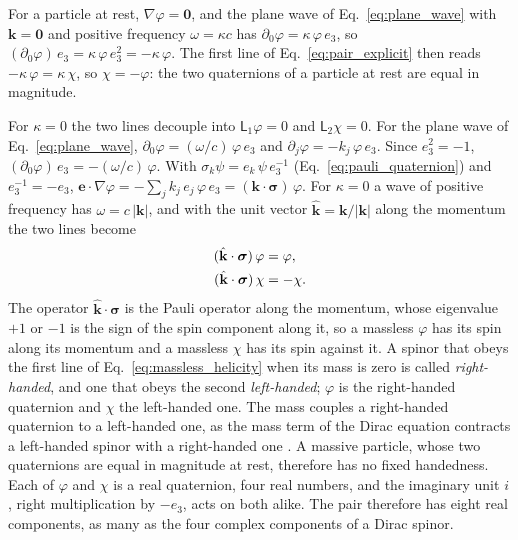 \documentclass[aps,prd,onecolumn,tightenlines,nofootinbib,notitlepage,11pt,floatfix]{revtex4-2}
\theoremstyle{indentedtheorem}
\begin{document}
For a particle at rest, $\nabla\varphi=\mathbf{0}$, and the plane wave of Eq.~\eqref{eq:plane_wave} with $\mathbf{k}=\mathbf{0}$ and positive frequency $\omega=\kappa c$ has $\partial_0\varphi=\kappa\,\varphi\,e_3$, so $(\partial_0\varphi)\,e_3=\kappa\,\varphi\,e_3^2=-\kappa\,\varphi$. The first line of Eq.~\eqref{eq:pair_explicit} then reads $-\kappa\,\varphi=\kappa\,\chi$, so $\chi=-\varphi$: the two quaternions of a particle at rest are equal in magnitude.

For $\kappa=0$ the two lines decouple into $\mathsf{L}_1\varphi=0$ and $\mathsf{L}_2\chi=0$. For the plane wave of Eq.~\eqref{eq:plane_wave}, $\partial_0\varphi=(\omega/c)\,\varphi\,e_3$ and $\partial_j\varphi=-k_j\,\varphi\,e_3$. Since $e_3^2=-1$, $(\partial_0\varphi)\,e_3=-(\omega/c)\,\varphi$. With $\sigma_k\psi=e_k\,\psi\,e_3^{-1}$ (Eq.~\eqref{eq:pauli_quaternion}) and $e_3^{-1}=-e_3$, $\mathbf{e}\cdot\nabla\varphi=-\sum_jk_j\,e_j\,\varphi\,e_3=(\mathbf{k}\cdot\boldsymbol{\sigma})\,\varphi$. For $\kappa=0$ a wave of positive frequency has $\omega=c\,|\mathbf{k}|$, and with the unit vector $\hat{\mathbf{k}}=\mathbf{k}/|\mathbf{k}|$ along the momentum the two lines become
\begin{align}
    (\hat{\mathbf{k}}\cdot\boldsymbol{\sigma}) \, \varphi &= \varphi , \notag\\
    (\hat{\mathbf{k}}\cdot\boldsymbol{\sigma}) \, \chi &= -\chi .
    \label{eq:massless_helicity}
\end{align}
The operator $\hat{\mathbf{k}}\cdot\boldsymbol{\sigma}$ is the Pauli operator along the momentum, whose eigenvalue $+1$ or $-1$ is the sign of the spin component along it, so a massless $\varphi$ has its spin along its momentum and a massless $\chi$ has its spin against it. A spinor that obeys the first line of Eq.~\eqref{eq:massless_helicity} when its mass is zero is called \emph{right-handed}, and one that obeys the second \emph{left-handed}; $\varphi$ is the right-handed quaternion and $\chi$ the left-handed one. The mass couples a right-handed quaternion to a left-handed one, as the mass term of the Dirac equation contracts a left-handed spinor with a right-handed one \citep{Avignone2008Double}. A massive particle, whose two quaternions are equal in magnitude at rest, therefore has no fixed handedness. Each of $\varphi$ and $\chi$ is a real quaternion, four real numbers, and the imaginary unit $i$, right multiplication by $-e_3$, acts on both alike. The pair therefore has eight real components, as many as the four complex components of a Dirac spinor.
\end{document}
